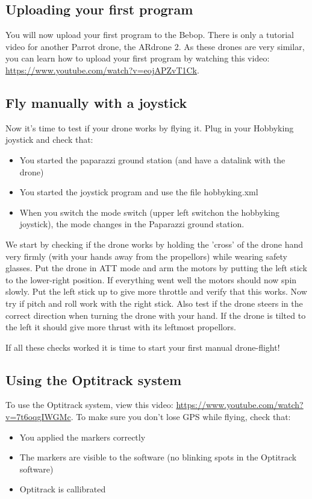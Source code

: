 \documentclass{article}
\begin{document}
\subsection*{Uploading your first program}
You will now upload your first program to the Bebop. There is only a tutorial video for another Parrot drone, the ARdrone 2. As these drones are very similar, you can learn how to upload your first program by watching this video: \url{https://www.youtube.com/watch?v=eojAPZvT1Ck}.

\subsection*{Fly manually with a joystick }
Now it's time to test if your drone works by flying it. Plug in your Hobbyking joystick and check that:
\begin{itemize}
\item You started the paparazzi ground station (and have a datalink with the drone)
\item You started the joystick program and use the file hobbyking.xml
\item When you switch the mode switch (upper left switchon the hobbyking joystick), the mode changes in the Paparazzi ground station.
\end{itemize}

We start by checking if the drone works by holding the 'cross' of the drone hand very firmly (with your hands away from the propellors) while wearing safety glasses. Put the drone in ATT mode and arm the motors by putting the left stick to the lower-right position. If everything went well the motors should now spin slowly. Put the left stick up to give more throttle and verify that this works. Now try if pitch and roll work with the right stick. 
Also test if the drone steers in the correct direction when turning the drone with your hand. If the drone is tilted to the left it should give more thrust with its leftmost propellors. 

If all these checks worked it is time to start your first manual drone-flight! 

\subsection*{Using the Optitrack system}
To use the Optitrack system, view this video: \url{https://www.youtube.com/watch?v=7t6oqgIWGMc}.
To make sure you don't lose GPS while flying, check that:
\begin{itemize}
\item You applied the markers correctly 
\item The markers are visible to the software (no blinking spots in the Optitrack software)
\item Optitrack is callibrated
\end{itemize}
\end{document}

